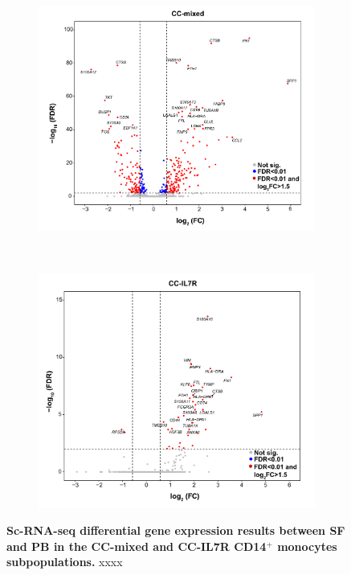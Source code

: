\bigskip
\begin{figure}[H]
\centering
\begin{subfigure}[b]{0.70\textwidth}
\centering 
\includegraphics[width=\textwidth]{./Results3/pdfs/PSA_10X_all_combined_aligned_monocytes_DGE_SF_vs_PB_cluster_0_vulcano_plot}
\caption{}
\end{subfigure}
~
\begin{subfigure}[b]{0.70\textwidth} 
\centering
\includegraphics[width=\textwidth]{./Results3/pdfs/PSA_10X_all_combined_aligned_monocytes_DGE_SF_vs_PB_IL7R_vulcano_plot}
\caption{}
\end{subfigure}
\caption[Sc-RNA-seq differential gene expression results between SF and PB in the CC-mixed and CC-IL7R CD14$^+$ monocytes subpopulations.]{\textbf{Sc-RNA-seq differential gene expression results between SF and PB in the CC-mixed and CC-IL7R CD14$^+$ monocytes subpopulations.} xxxx}
\label{figure:PsA_scRNAseq_vulcano_plots_mixed_and_IL7R_clusters}
\end{figure}


